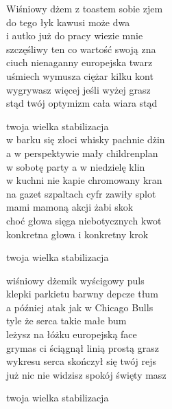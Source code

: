 \begin{text}
    Wiśniowy dżem z toastem sobie zjem\\
    do tego łyk kawusi może dwa\\
    i autko już do pracy wiezie mnie\\
    szczęśliwy ten co wartość swoją zna\\
    ciuch nienaganny europejska twarz\\
    uśmiech wymusza ciężar kilku kont\\
    wygrywasz więcej jeśli wyżej grasz\\
    stąd twój optymizm cała wiara stąd

    twoja wielka stabilizacja\\
    w barku się złoci whisky pachnie dżin\\
    a w perspektywie mały childrenplan\\
    w sobotę party a w niedzielę klin\\
    w kuchni nie kapie chromowany kran\\
    na gazet szpaltach cyfr zawiły splot\\
    mami mamoną akcji żabi skok\\
    choć głowa sięga niebotycznych kwot\\
    konkretna głowa i konkretny krok

    twoja wielka stabilizacja

    wiśniowy dżemik wyścigowy puls\\
    klepki parkietu barwny depcze tłum\\
    a później atak jak w Chicago Bulls\\
    tyle że serca takie małe bum\\
    leżysz na łóżku europejską face\\
    grymas ci ściągnął linią prostą grasz\\
    wykresu serca skończył się twój rejs\\
    już nic nie widzisz spokój święty masz

    twoja wielka stabilizacja
\end{text}
\begin{chord}

\end{chord}